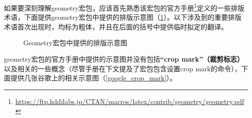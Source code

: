 ﻿\documentclass{article}
\begin{document}
如果要深刻理解geometry宏包，应该首先熟悉该宏包的官方手册\footnote{\url{https://ftp.kddilabs.jp/CTAN/macros/latex/contrib/geometry/geometry.pdf}}定义的一些排版术语，下面提供geometry宏包中提供的排版示意图（\ref{geometry_documentation_figure}）。以下涉及到的重要排版术语首次出现时，均标为粗体，并且在后面的括号中提供临时拟定的翻译。

\begin{figure}
    \centering
    \caption{Geometry宏包中提供的排版示意图}
    \label{geometry_documentation_figure}
\end{figure}

geometry宏包的官方手册中提供的示意图并没有包括\textbf{``crop mark''（裁剪标志）}以及相关的一些概念（尽管手册在下文提及了宏包包含设置crop mark的命令），下面提供几张谷歌上的相关示意图（\ref{google_crop_mark}）。
\end{document}
